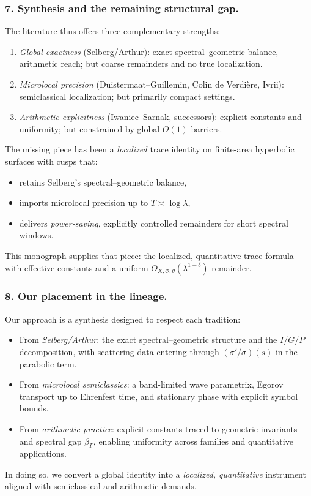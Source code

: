 \subsubsection*{7. Synthesis and the remaining structural gap.}
The literature thus offers three complementary strengths:
\begin{enumerate}[label=\alph*)]
  \item \emph{Global exactness} (Selberg/Arthur): exact spectral–geometric balance, arithmetic reach; but coarse remainders and no true localization.
  \item \emph{Microlocal precision} (Duistermaat–Guillemin, Colin de Verdière, Ivrii): semiclassical localization; but primarily compact settings.
  \item \emph{Arithmetic explicitness} (Iwaniec–Sarnak, successors): explicit constants and uniformity; but constrained by global $O(1)$ barriers.
\end{enumerate}
The missing piece has been a \emph{localized} trace identity on finite-area hyperbolic surfaces with cusps that:
\begin{itemize}
  \item retains Selberg’s spectral–geometric balance,
  \item imports microlocal precision up to $T\asymp\log\lambda$,
  \item delivers \emph{power-saving}, explicitly controlled remainders for short spectral windows.
\end{itemize}
This monograph supplies that piece: the localized, quantitative trace formula with effective constants and a uniform
$O_{X,\Phi,\theta}(\lambda^{1-\delta})$ remainder.

\subsubsection*{8. Our placement in the lineage.}
Our approach is a synthesis designed to respect each tradition:
\begin{itemize}
  \item From \emph{Selberg/Arthur}: the exact spectral–geometric structure and the $I/G/P$ decomposition, with scattering data
        entering through $(\sigma'/\sigma)(s)$ in the parabolic term.
  \item From \emph{microlocal semiclassics}: a band-limited wave parametrix, Egorov transport up to Ehrenfest time,
        and stationary phase with explicit symbol bounds.
  \item From \emph{arithmetic practice}: explicit constants traced to geometric invariants and spectral gap $\beta_\Gamma$,
        enabling uniformity across families and quantitative applications.
\end{itemize}
In doing so, we convert a global identity into a \emph{localized, quantitative} instrument aligned with semiclassical
and arithmetic demands.

